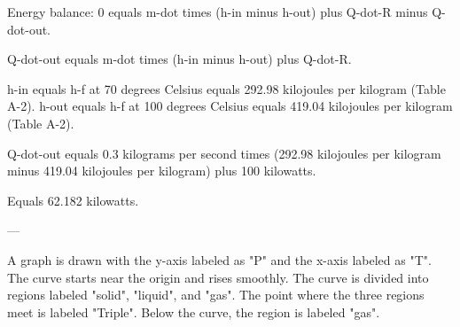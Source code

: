 Energy balance:  
0 equals m-dot times (h-in minus h-out) plus Q-dot-R minus Q-dot-out.  

Q-dot-out equals m-dot times (h-in minus h-out) plus Q-dot-R.  

h-in equals h-f at 70 degrees Celsius equals 292.98 kilojoules per kilogram (Table A-2).  
h-out equals h-f at 100 degrees Celsius equals 419.04 kilojoules per kilogram (Table A-2).  

Q-dot-out equals 0.3 kilograms per second times (292.98 kilojoules per kilogram minus 419.04 kilojoules per kilogram) plus 100 kilowatts.  

Equals 62.182 kilowatts.  

---

A graph is drawn with the y-axis labeled as "P" and the x-axis labeled as "T". The curve starts near the origin and rises smoothly. The curve is divided into regions labeled "solid", "liquid", and "gas". The point where the three regions meet is labeled "Triple". Below the curve, the region is labeled "gas".